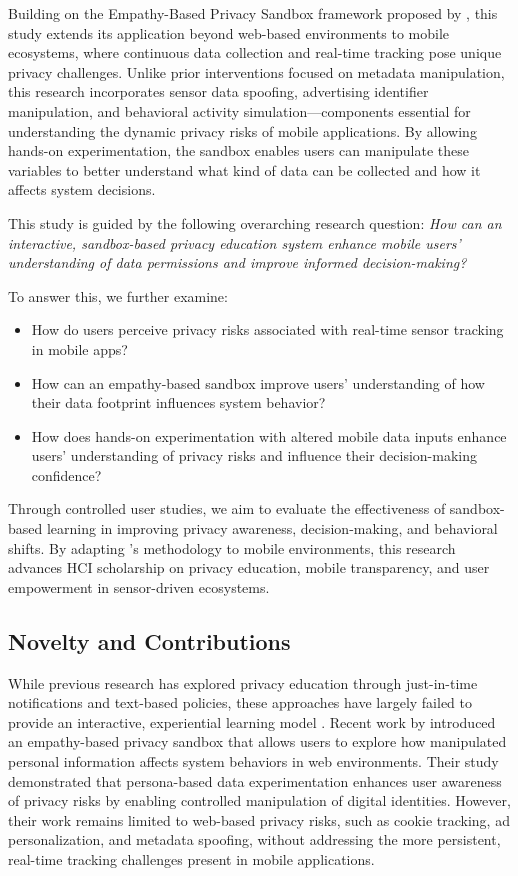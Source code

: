 \documentclass[acmlarge, nonacm]{acmart}
\begin{document}
Building on the Empathy-Based Privacy Sandbox framework proposed by \citet{Chaoran2023EmpathySandbox}, this study extends its application beyond web-based environments to mobile ecosystems, where continuous data collection and real-time tracking pose unique privacy challenges. Unlike prior interventions focused on metadata manipulation, this research incorporates sensor data spoofing, advertising identifier manipulation, and behavioral activity simulation—components essential for understanding the dynamic privacy risks of mobile applications. By allowing hands-on experimentation, the sandbox enables users can manipulate these variables to better understand what kind of data can be collected and how it affects system decisions.

This study is guided by the following overarching research question: \textit{How can an interactive, sandbox-based privacy education system enhance mobile users' understanding of data permissions and improve informed decision-making?}

To answer this, we further examine:
\begin{itemize}
    \item How do users perceive privacy risks associated with real-time sensor tracking in mobile apps?
    \item How can an empathy-based sandbox improve users’ understanding of how their data footprint influences system behavior?
    \item How does hands-on experimentation with altered mobile data inputs enhance users' understanding of privacy risks and influence their decision-making confidence?
\end{itemize}

Through controlled user studies, we aim to evaluate the effectiveness of sandbox-based learning in improving privacy awareness, decision-making, and behavioral shifts. By adapting \citet{Chaoran2023EmpathySandbox}'s methodology to mobile environments, this research advances HCI scholarship on privacy education, mobile transparency, and user empowerment in sensor-driven ecosystems.


\subsection{Novelty and Contributions}

While previous research has explored privacy education through just-in-time notifications and text-based policies, these approaches have largely failed to provide an interactive, experiential learning model \cite{feng2021yaodesign}. Recent work by \citet{Chaoran2023EmpathySandbox} introduced an empathy-based privacy sandbox that allows users to explore how manipulated personal information affects system behaviors in web environments. Their study demonstrated that persona-based data experimentation enhances user awareness of privacy risks by enabling controlled manipulation of digital identities. However, their work remains limited to web-based privacy risks, such as cookie tracking, ad personalization, and metadata spoofing, without addressing the more persistent, real-time tracking challenges present in mobile applications.
\end{document}
